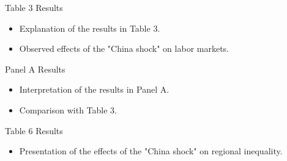 \begin{frame}{Table 3 Results}
    \begin{itemize}
        \item Explanation of the results in Table 3.
        \item Observed effects of the "China shock" on labor markets.
    \end{itemize}
\end{frame}

\begin{frame}{Panel A Results}
    \begin{itemize}
        \item Interpretation of the results in Panel A.
        \item Comparison with Table 3.
    \end{itemize}
\end{frame}

\begin{frame}{Table 6 Results}
    \begin{itemize}
        \item Presentation of the effects of the "China shock" on regional inequality.
    \end{itemize}
\end{frame}

